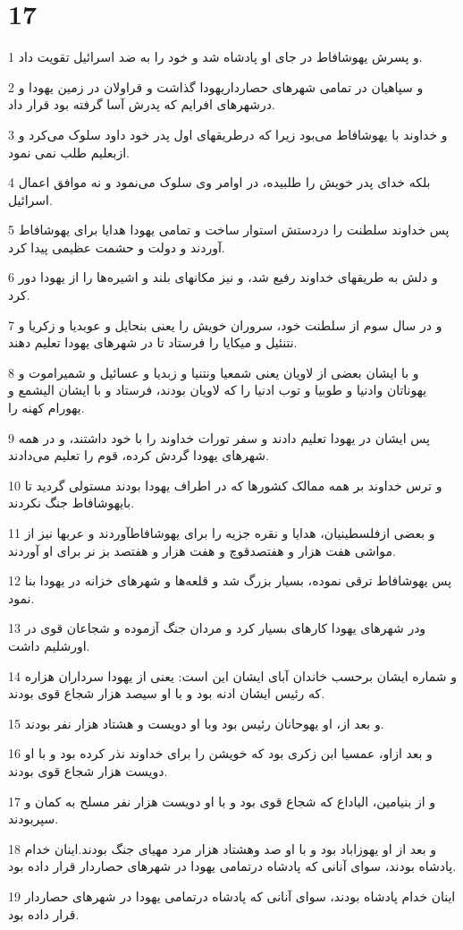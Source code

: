 \chapter{17}

\par 1 و پسرش یهوشافاط در جای او پادشاه شد و خود را به ضد اسرائیل تقویت داد.
\par 2 و سپاهیان در تمامی شهرهای حصارداریهودا گذاشت و قراولان در زمین یهودا و درشهرهای افرایم که پدرش آسا گرفته بود قرار داد.
\par 3 و خداوند با یهوشافاط می‌بود زیرا که درطریقهای اول پدر خود داود سلوک می‌کرد و ازبعلیم طلب نمی نمود.
\par 4 بلکه خدای پدر خویش را طلبیده، در اوامر وی سلوک می‌نمود و نه موافق اعمال اسرائیل.
\par 5 پس خداوند سلطنت را دردستش استوار ساخت و تمامی یهودا هدایا برای یهوشافاط آوردند و دولت و حشمت عظیمی پیدا کرد.
\par 6 و دلش به طریقهای خداوند رفیع شد، و نیز مکانهای بلند و اشیره‌ها را از یهودا دور کرد.
\par 7 و در سال سوم از سلطنت خود، سروران خویش را یعنی بنحایل و عوبدیا و زکریا و نتنئیل و میکایا را فرستاد تا در شهرهای یهودا تعلیم دهند.
\par 8 و با ایشان بعضی از لاویان یعنی شمعیا ونتنیا و زبدیا و عسائیل و شمیراموت و یهوناتان وادنیا و طوبیا و توب ادنیا را که لاویان بودند، فرستاد و با ایشان الیشمع و یهورام کهنه را.
\par 9 پس ایشان در یهودا تعلیم دادند و سفر تورات خداوند را با خود داشتند، و در همه شهرهای یهودا گردش کرده، قوم را تعلیم می‌دادند.
\par 10 و ترس خداوند بر همه ممالک کشورها که در اطراف یهودا بودند مستولی گردید تا بایهوشافاط جنگ نکردند.
\par 11 و بعضی ازفلسطینیان، هدایا و نقره جزیه را برای یهوشافاطآوردند و عربها نیز از مواشی هفت هزار و هفتصدقوچ و هفت هزار و هفتصد بز نر برای او آوردند.
\par 12 پس یهوشافاط ترقی نموده، بسیار بزرگ شد و قلعه‌ها و شهرهای خزانه در یهودا بنا نمود.
\par 13 ودر شهرهای یهودا کارهای بسیار کرد و مردان جنگ آزموده و شجاعان قوی در اورشلیم داشت.
\par 14 و شماره ایشان برحسب خاندان آبای ایشان این است: یعنی از یهودا سرداران هزاره که رئیس ایشان ادنه بود و با او سیصد هزار شجاع قوی بودند.
\par 15 و بعد از، او یهوحانان رئیس بود وبا او دویست و هشتاد هزار نفر بودند.
\par 16 و بعد ازاو، عمسیا ابن زکری بود که خویشن را برای خداوند نذر کرده بود و با او دویست هزار شجاع قوی بودند.
\par 17 و از بنیامین، الیاداع که شجاع قوی بود و با او دویست هزار نفر مسلح به کمان و سپربودند.
\par 18 و بعد از او یهوزاباد بود و با او صد وهشتاد هزار مرد مهیای جنگ بودند.اینان خدام پادشاه بودند، سوای آنانی که پادشاه درتمامی یهودا در شهرهای حصاردار قرار داده بود.
\par 19 اینان خدام پادشاه بودند، سوای آنانی که پادشاه درتمامی یهودا در شهرهای حصاردار قرار داده بود.
 
